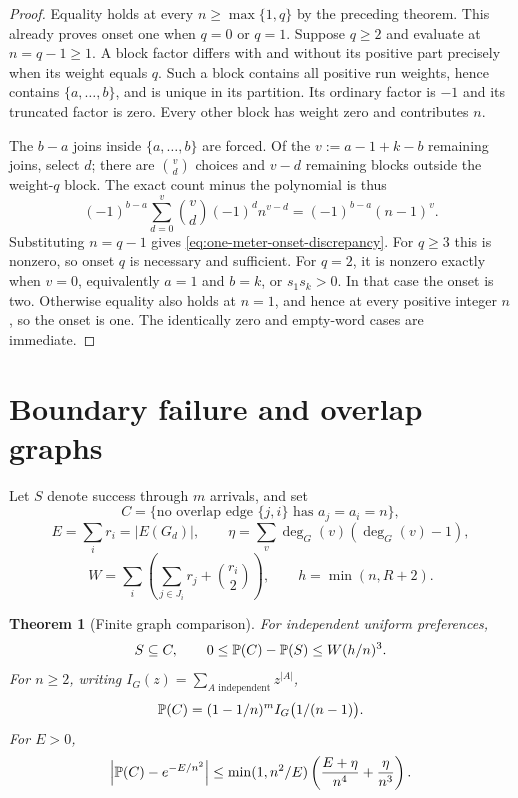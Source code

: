 \documentclass[11pt,a4paper]{article}
\newtheorem{theorem}{Theorem}[section]\newtheorem{lemma}[theorem]{Lemma}\newtheorem{corollary}[theorem]{Corollary}\newtheorem{proposition}[theorem]{Proposition}\theoremstyle{remark}\newtheorem{remark}[theorem]{Remark}\newtheorem{example}[theorem]{Example}
\begin{document}
\begin{proof}
Equality holds at every $n\geq\max\{1,q\}$ by the preceding theorem.
This already proves onset one when $q=0$ or $q=1$.
Suppose $q\geq2$ and evaluate at $n=q-1\geq1$.
A block factor differs with and without its positive part precisely when
its weight equals $q$. Such a block contains all positive run weights,
hence contains $\{a,\ldots,b\}$, and is unique in its partition.
Its ordinary factor is $-1$ and its truncated factor is zero.
Every other block has weight zero and contributes $n$.

The $b-a$ joins inside $\{a,\ldots,b\}$ are forced. Of the
$v:=a-1+k-b$ remaining joins, select $d$; there are $\binom vd$ choices
and $v-d$ remaining blocks outside the weight-$q$ block.
The exact count minus the polynomial is thus
\[
 (-1)^{b-a}\sum_{d=0}^{v}\binom vd(-1)^d n^{v-d}
 =(-1)^{b-a}(n-1)^v.
\]
Substituting $n=q-1$ gives \eqref{eq:one-meter-onset-discrepancy}.
For $q\geq3$ this is nonzero, so onset $q$ is necessary and sufficient.
For $q=2$, it is nonzero exactly when $v=0$, equivalently $a=1$ and
$b=k$, or $s_1s_k>0$. In that case the onset is two.
Otherwise equality also holds at $n=1$, and hence at every positive
integer $n$, so the onset is one.
The identically zero and empty-word cases are immediate.
\end{proof}

\section{Boundary failure and overlap graphs}\label{sec:boundary}

Let $S$ denote success through $m$ arrivals, and set
\[
 C=\{\text{no overlap edge }\{j,i\}\text{ has }a_j=a_i=n\},
\]
\[
 E=\sum_i r_i=|E(G_d)|,\qquad
 \eta=\sum_v\deg_G(v)(\deg_G(v)-1),
\]
\[
 W=\sum_i\left(\sum_{j\in J_i}r_j+\binom{r_i}{2}\right),
 \qquad h=\min(n,R+2).
\]

\begin{theorem}[Finite graph comparison]\label{thm:graph}
For independent uniform preferences,
\[
 S\subseteq C,\qquad 0\le\mathbb P(C)-\mathbb P(S)\le W(h/n)^3.
\]
For $n\ge2$, writing $I_G(z)=\sum_{A\text{ independent}}z^{|A|}$,
\[
 \mathbb P(C)=(1-1/n)^mI_G\bigl(1/(n-1)\bigr).
\]
For $E>0$,
\[
 \left|\mathbb P(C)-e^{-E/n^2}\right|
 \le\min(1,n^2/E)
       \left(\frac{E+\eta}{n^4}+\frac{\eta}{n^3}\right).
\]
\end{theorem}
\end{document}

